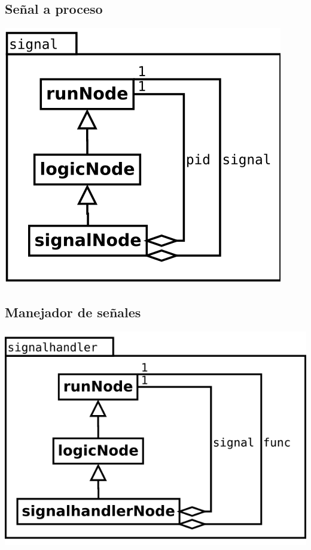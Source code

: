 \subsection {Señal a proceso} 
\begin{center}
\includegraphics[scale=0.4]{signal.png} \\
\end{center}

\subsection {Manejador de señales} 
\begin{center}
\includegraphics[scale=0.4]{signalhandler.png} \\
\end{center}

